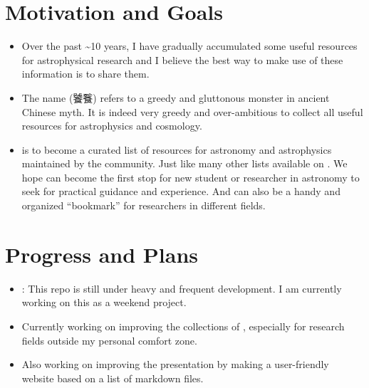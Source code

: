 \documentclass[letterpaper,10pt,english]{sphinxmanual}
\begin{document}
\chapter{Motivation and Goals}
\label{\detokenize{index:motivation-and-goals}}\begin{itemize}
\item {} 
Over the past \textasciitilde{}10 years, I have gradually accumulated some useful resources for
astrophysical research and I believe the best way to make use of these information is
to share them.

\item {} 
The name  (饕餮) refers to a greedy and gluttonous monster in ancient Chinese myth.
It is indeed very greedy and over-ambitious to collect all useful resources for astrophysics
and cosmology.

\item {} 
 is to become a curated list of resources for astronomy and
astrophysics maintained by the community. Just like many other  lists available
on . We hope  can become the first stop for new student or researcher in
astronomy to seek for practical guidance and experience.
And  can also be a handy and organized “bookmark” for researchers in different fields.

\end{itemize}


\chapter{Progress and Plans}
\label{\detokenize{index:progress-and-plans}}\begin{itemize}
\item {} 
: This repo is still under heavy and frequent development.
I am currently working on this as a weekend project.

\item {} 
Currently working on improving the collections of , especially for research fields
outside my personal comfort zone. 

\item {} 
Also working on improving the presentation by making a user-friendly website based on a list
of markdown files.

\end{itemize}
\end{document}
